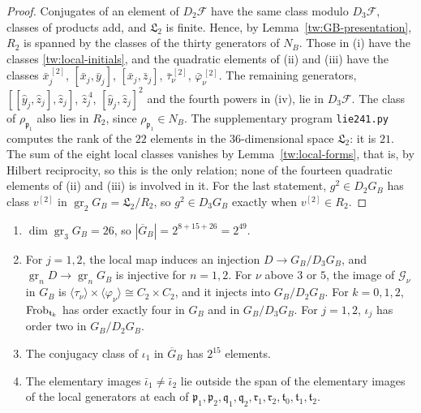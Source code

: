 \begin{proof}
Conjugates of an element of $D_2\mathcal F$ have the same class modulo
$D_3\mathcal F$, classes of products add, and $\mathfrak L_2$ is finite.
Hence, by Lemma~\ref{tw:GB-presentation}, $R_2$ is spanned by the classes of
the thirty generators of $N_B$. Those in (i) have the classes
\eqref{tw:local-initials}, and the quadratic elements of (ii) and (iii) have
the classes $\bar x_j^{\,[2]}$, $[\bar x_j,\bar y_j]$, $[\bar x_j,\bar z_j]$,
$\bar\tau_\nu^{\,[2]}$, $\bar\varphi_\nu^{\,[2]}$. The remaining generators,
$[[\hat y_j,\hat z_j],\hat z_j]$, $\hat z_j^{\,4}$, $[\hat y_j,\hat z_j]^2$ and
the fourth powers in (iv), lie in $D_3\mathcal F$. The class of
$\rho_{\mathfrak p_1}$ also lies in $R_2$, since $\rho_{\mathfrak p_1}\in N_B$.
The supplementary program \texttt{lie241.py} computes the rank of the $22$
elements in the $36$-dimensional space $\mathfrak L_2$: it is $21$. The sum of
the eight local classes vanishes by Lemma~\ref{tw:local-forms}, that is, by
Hilbert reciprocity, so this is the only relation; none of the fourteen
quadratic elements of (ii) and (iii) is involved in it. For the last statement, $g^2\in D_2G_B$ has class $v^{[2]}$ in
$\operatorname{gr}_2G_B=\mathfrak L_2/R_2$, so $g^2\in D_3G_B$ exactly when
$v^{[2]}\in R_2$.
\end{proof}

\begin{lemma}\label{tw:retained-quotient}
\begin{enumerate}
\item[(a)] $\dim\operatorname{gr}_3G_B=26$, so $|\overline G_B|=2^{8+15+26}=2^{49}$.
\item[(b)] For $j=1,2$, the local map induces an injection
 $D\to G_B/D_3G_B$, and $\operatorname{gr}_nD\to\operatorname{gr}_nG_B$ is
 injective for $n=1,2$. For $\nu$ above $3$ or $5$, the image of
 $\mathcal G_\nu$ in $G_B$ is
 $\langle\tau_\nu\rangle\times\langle\varphi_\nu\rangle\cong C_2\times C_2$,
 and it injects into $G_B/D_2G_B$. For $k=0,1,2$, $\operatorname{Frob}_{\mathfrak t_k}$ has
 order exactly four in $G_B$ and in $G_B/D_3G_B$. For $j=1,2$, $\iota_j$ has
 order two in $G_B/D_2G_B$.
\item[(c)] The conjugacy class of $\iota_1$ in $\overline G_B$ has $2^{15}$
 elements.
\item[(d)] The elementary images $\bar\iota_1\ne\bar\iota_2$ lie outside the
 span of the elementary images of the local generators at each of
 $\mathfrak p_1,\mathfrak p_2,\mathfrak q_1,\mathfrak q_2,\mathfrak r_1,\mathfrak r_2,\mathfrak t_0,\mathfrak t_1,\mathfrak t_2$.
\end{enumerate}
\end{lemma}

